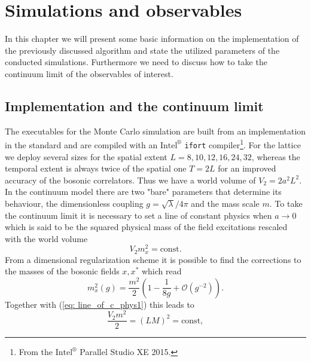 \chapter{Simulations and observables}\label{ch: parameters}
In this chapter we will present some basic information on the implementation of the previously discussed algorithm and state the utilized parameters of the conducted simulations. Furthermore we need to discuss how to take the continuum limit of the observables of interest.
%
%
%
%
%
%
\section{Implementation and the continuum limit}
The executables for the Monte Carlo simulation are built from an implementation in the  standard and are compiled with an $\text{Intel}^{\circledR}$ \texttt{ifort} compiler\footnote{From the $\text{Intel}^{\circledR}$ Parallel Studio XE 2015.}. For the lattice we deploy several sizes for the spatial extent $L=8,10,12,16,24,32$, whereas the temporal extent is always twice of the spatial one $T=2L$ for an improved accuracy of the bosonic correlators. Thus we have a world volume of $V_{2}=2a^{2}L^{2}$. In the continuum model there are two "bare" parameters that determine its behaviour, the dimensionless coupling $g=\sqrt{\lambda}/4\pi$ and the mass scale $m$. To take the continuum limit it is necessary to set a line of constant physics when $a \to 0$ which is said to be the squared physical mass of the field excitations rescaled with the world volume
%
%
\begin{equation}
V_{2}m_{x}^{2} = \text{const}.
\label{eq: line_of_c_phys1}
\end{equation}
%
%
From a dimensional regularization scheme it is possible to find the corrections to the masses of the bosonic fields $x,x^{*}$ which read \cite{Giombi:2010bj}
%
%
\begin{equation}
m_{x}^{2}(g) = \frac{m^{2}}{2}\left(1 - \frac{1}{8g} + \mathcal{O}(g^{-2}) \right).
\label{eq: m_x}
\end{equation}
%
%
Together with (\ref{eq: line_of_c_phys1}) this leads to 
%
%
\begin{equation}
\frac{V_{2}m^{2}}{2} = (LM)^{2} = \text{const},
\label{eq: line_of_c_phys2}
\end{equation}
%
%
